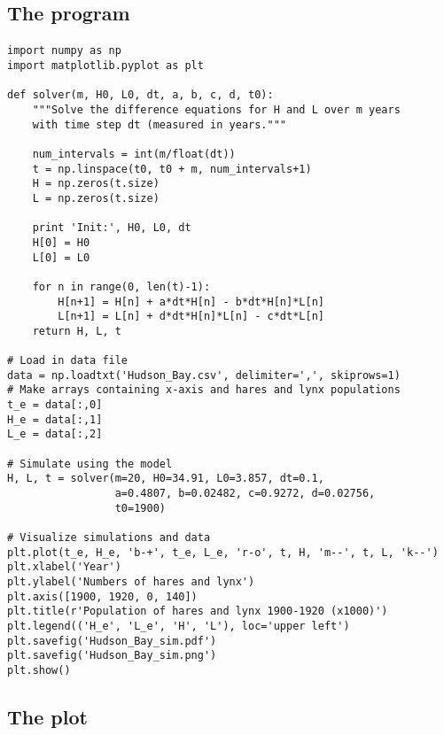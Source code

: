 \documentclass[%
twoside,                 %
final,                   %
10pt]{article}
\begin{document}
\noindent



\subsection*{The program}


\paragraph{}
\begin{verbatim}
import numpy as np
import matplotlib.pyplot as plt

def solver(m, H0, L0, dt, a, b, c, d, t0):
    """Solve the difference equations for H and L over m years
    with time step dt (measured in years."""

    num_intervals = int(m/float(dt))
    t = np.linspace(t0, t0 + m, num_intervals+1)
    H = np.zeros(t.size)
    L = np.zeros(t.size)

    print 'Init:', H0, L0, dt
    H[0] = H0
    L[0] = L0

    for n in range(0, len(t)-1):
        H[n+1] = H[n] + a*dt*H[n] - b*dt*H[n]*L[n]
        L[n+1] = L[n] + d*dt*H[n]*L[n] - c*dt*L[n]
    return H, L, t

# Load in data file
data = np.loadtxt('Hudson_Bay.csv', delimiter=',', skiprows=1)
# Make arrays containing x-axis and hares and lynx populations
t_e = data[:,0]
H_e = data[:,1]
L_e = data[:,2]

# Simulate using the model
H, L, t = solver(m=20, H0=34.91, L0=3.857, dt=0.1,
                 a=0.4807, b=0.02482, c=0.9272, d=0.02756,
                 t0=1900)

# Visualize simulations and data
plt.plot(t_e, H_e, 'b-+', t_e, L_e, 'r-o', t, H, 'm--', t, L, 'k--')
plt.xlabel('Year')
plt.ylabel('Numbers of hares and lynx')
plt.axis([1900, 1920, 0, 140])
plt.title(r'Population of hares and lynx 1900-1920 (x1000)')
plt.legend(('H_e', 'L_e', 'H', 'L'), loc='upper left')
plt.savefig('Hudson_Bay_sim.pdf')
plt.savefig('Hudson_Bay_sim.png')
plt.show()
\end{verbatim}



\subsection*{The plot}
\end{document}
